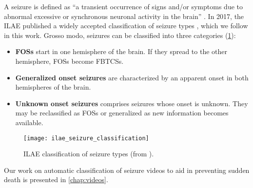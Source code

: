 A seizure is defined as ``a transient occurrence of signs and/or symptoms due to abnormal excessive or synchronous neuronal activity in the brain'' \cite{fisher_epileptic_2005}.
In 2017, the \ac{ILAE} published a widely accepted classification of seizure types \cite{fisher_operational_2017}, which we follow in this work.
Grosso modo, seizures can be classified into three categories \cite{fisher_epileptic_2005} (\cref{fig:ilae_seizure_types}):
\begin{itemize}
  \item \textbf{\Acp{FOS}} start in one hemisphere of the brain. If they spread to the other hemisphere, \acp{FOS} become \acp{FBTCS}.
  \item \textbf{Generalized onset seizures} are characterized by an apparent onset in both hemispheres of the brain.
  \item \textbf{Unknown onset seizures} comprises seizures whose onset is unknown. They may be reclassified as \acp{FOS} or generalized as new information becomes available.
\end{itemize}

\begin{figure}
  \centering

  \texttt{[image: ilae\_seizure\_classification]}
  \caption[ILAE classification of seizure types]{
    \Acf*{ILAE} classification of seizure types (from \cite{fisher_operational_2017}).
  }
  \label{fig:ilae_seizure_types}
\end{figure}

Our work on automatic classification of seizure videos to aid in preventing sudden death is presented in \cref{chap:videos}.

